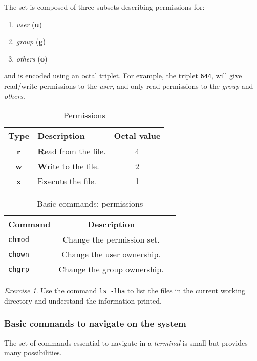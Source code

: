\documentclass[onecolumn, oneside, a4paper, 11pt]{memoir}
\theoremstyle{remark}
\newtheorem{ex}{Exercise}
\begin{document}
\medskip
The set is composed of three subsets describing permissions for:
\begin{enumerate}
\item \textit{user} (\textbf{u})
\item \textit{group} (\textbf{g})
\item \textit{others} (\textbf{o})
\end{enumerate}
and is encoded using an octal triplet.
For example, the triplet \texttt{644}, will give read/write permissions to the \textit{user}, and only read permissions to the \textit{group} and \textit{others}.

\medskip
\begin{table}[h!]
\centering
\caption{Permissions}
\begin{tabular}{|c|l|c|}
  \hline
  Type       & Description            & Octal value\\
  \hline
  \textbf{r} & \textbf{R}ead from the file.& 4 \\
  \textbf{w} & \textbf{W}rite to the file. & 2 \\
  \textbf{x} & E\textbf{x}ecute the file. &  1 \\
  \hline
\end{tabular}
\end{table}

\begin{table}[h!]
\centering
\caption{Basic commands: permissions}
\begin{tabular}{|l|c|r|}
  \hline
  Command & Description \\
  \hline
  \texttt{chmod} & Change the permission set. \\
  \texttt{chown} & Change the user ownership. \\
  \texttt{chgrp} & Change the group ownership. \\
  \hline
\end{tabular}
\end{table}


\begin{ex}
Use the command \texttt{ls -lha} to list the files in the current working directory and understand the information printed.
\end{ex}


\subsubsection{Basic commands to navigate on the system}

The set of commands essential to navigate in a \textit{terminal} is small but provides many possibilities.
\end{document}
